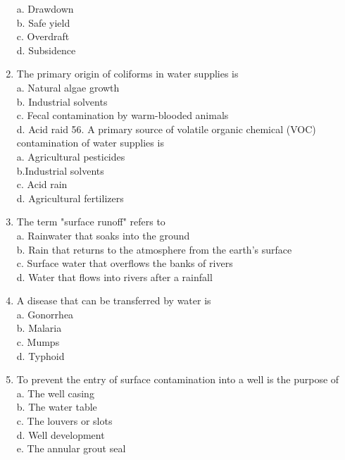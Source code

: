 \begin{enumerate}
a. Drawdown\\
b. Safe yield\\
c. Overdraft\\
d. Subsidence\\
\item The primary origin of coliforms in water supplies is\\
a. Natural algae growth\\
b. Industrial solvents\\
c. Fecal contamination by warm-blooded animals\\
d. Acid raid 56. A primary source of volatile organic chemical (VOC) contamination of water supplies is\\
a. Agricultural pesticides\\
b.Industrial solvents\\
c. Acid rain\\
d. Agricultural fertilizers\\
\item The term "surface runoff" refers to\\
a. Rainwater that soaks into the ground\\
b. Rain that returns to the atmosphere from the earth's surface\\
c. Surface water that overflows the banks of rivers\\
d. Water that flows into rivers after a rainfall\\
\item A disease that can be transferred by water is\\
a. Gonorrhea\\
b. Malaria\\
c. Mumps\\
d. Typhoid\\
\item To prevent the entry of surface contamination into a well is the purpose of\\
a. The well casing\\
b. The water table\\
c. The louvers or slots\\
d. Well development\\
e. The annular grout seal\\


\end{enumerate}
